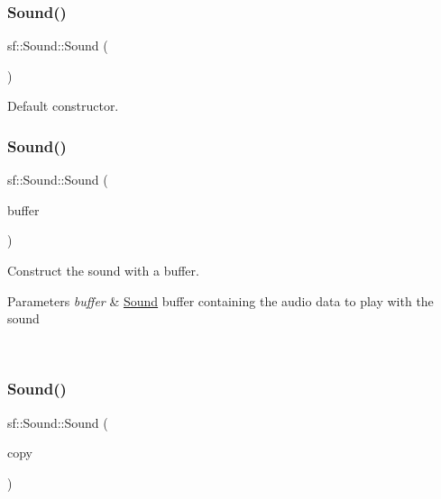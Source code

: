 \subsubsection{\texorpdfstring{Sound()}{Sound()}\hspace{0.1cm}{\footnotesize\ttfamily [1/3]}}
{\footnotesize\ttfamily sf\+::\+Sound\+::\+Sound (\begin{DoxyParamCaption}{ }\end{DoxyParamCaption})}



Default constructor. 

\begin{DoxyVerb}\end{DoxyVerb}
 \mbox{\label{classsf_1_1_sound_a3b1cfc19a856d4ff8c079ee41bb78e69}} 
\subsubsection{\texorpdfstring{Sound()}{Sound()}\hspace{0.1cm}{\footnotesize\ttfamily [2/3]}}
{\footnotesize\ttfamily sf\+::\+Sound\+::\+Sound (\begin{DoxyParamCaption}\item[{const \mbox{\hyperlink{classsf_1_1_sound_buffer}{Sound\+Buffer}} \&}]{buffer }\end{DoxyParamCaption})\hspace{0.3cm}{\ttfamily [explicit]}}



Construct the sound with a buffer. 


\begin{DoxyParams}{Parameters}
{\em buffer} & \mbox{\hyperlink{classsf_1_1_sound}{Sound}} buffer containing the audio data to play with the sound \begin{DoxyVerb}\end{DoxyVerb}
 \\
\hline
\end{DoxyParams}
\mbox{\label{classsf_1_1_sound_ae05eeed6377932694d86b3011be366c0}} 
\subsubsection{\texorpdfstring{Sound()}{Sound()}\hspace{0.1cm}{\footnotesize\ttfamily [3/3]}}
{\footnotesize\ttfamily sf\+::\+Sound\+::\+Sound (\begin{DoxyParamCaption}\item[{const \mbox{\hyperlink{classsf_1_1_sound}{Sound}} \&}]{copy }\end{DoxyParamCaption})}



